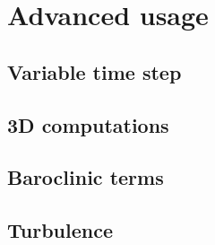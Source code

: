 \documentclass{report}
\newcommand{\todo}[1]{This section still has to be written by #1}
\begin{document}





	\section{Advanced usage}

		\subsection{Variable time step}
		

		\subsection{3D computations}
		

		\subsection{Baroclinic terms}
		


		\subsection{Turbulence}
		
\end{document}
